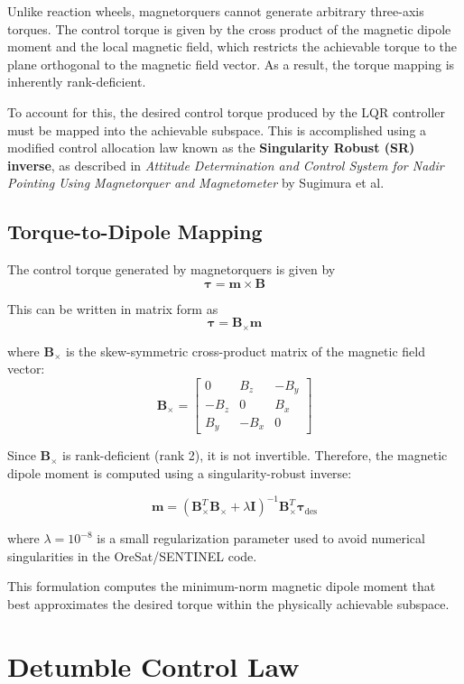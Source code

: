 Unlike reaction wheels, magnetorquers cannot generate arbitrary three-axis torques. The control torque is given by the cross product of the magnetic dipole moment and the local magnetic field, which restricts the achievable torque to the plane orthogonal to the magnetic field vector. As a result, the torque mapping is inherently rank-deficient.

To account for this, the desired control torque produced by the LQR controller must be mapped into the achievable subspace. This is accomplished using a modified control allocation law known as the \textbf{Singularity Robust (SR) inverse}, as described in \textit{Attitude Determination and Control System for Nadir Pointing Using Magnetorquer and Magnetometer} by Sugimura et al.

\subsection{Torque-to-Dipole Mapping}

The control torque generated by magnetorquers is given by
\[
\boldsymbol{\tau} = \mathbf{m} \times \mathbf{B}
\]

This can be written in matrix form as
\[
\boldsymbol{\tau} = \mathbf{B}_\times \mathbf{m}
\]

where $\mathbf{B}_\times$ is the skew-symmetric cross-product matrix of the magnetic field vector:
\[
\mathbf{B}_\times =
\begin{bmatrix}
	0 & B_z & -B_y \\
	-B_z & 0 & B_x \\
	B_y & -B_x & 0
\end{bmatrix}
\]

Since $\mathbf{B}_\times$ is rank-deficient (rank 2), it is not invertible. Therefore, the magnetic dipole moment is computed using a singularity-robust inverse:

\[
\mathbf{m} =
(\mathbf{B}_\times^T \mathbf{B}_\times + \lambda \mathbf{I})^{-1}
\mathbf{B}_\times^T \boldsymbol{\tau}_{\text{des}}
\]

where $\lambda = 10^{-8}$ is a small regularization parameter used to avoid numerical singularities in the OreSat/SENTINEL code.

This formulation computes the minimum-norm magnetic dipole moment that best approximates the desired torque within the physically achievable subspace.

\section{Detumble Control Law}

